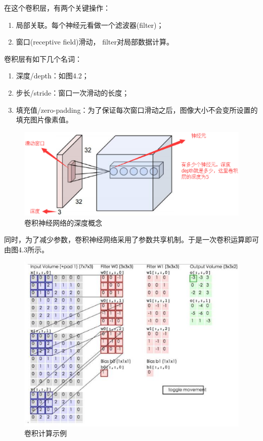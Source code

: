 \documentclass[UTF8, a4paper, 12pt]{report}
\begin{document}
			在这个卷积层，有两个关键操作：
			\begin{enumerate}[itemindent=1em]
				\renewcommand{\labelenumi}{\theenumi)}
				\item 局部关联。每个神经元看做一个滤波器(filter)；
				\item 窗口(receptive field)滑动， filter对局部数据计算。
			\end{enumerate}
	
			卷积层有如下几个名词：
			\begin{enumerate}[itemindent=1em]
				\renewcommand{\labelenumi}{\theenumi)}
				\item 深度/depth：如图4.2；
				\item 步长/stride：窗口一次滑动的长度；
				\item 填充值/zero-padding：为了保证每次窗口滑动之后，图像大小不会变所设置的填充图片像素值。
			\end{enumerate}
			\begin{figure}[!h]
			\centering
			\includegraphics[scale=0.45]{./img/Depth.eps}
			\caption{卷积神经网络的深度概念}
			\label{fig:4.2}
			\end{figure}
	
			同时，为了减少参数，卷积神经网络采用了参数共享机制。于是一次卷积运算即可由图4.3所示。
			\begin{figure}[!h]
			\centering
			\includegraphics[scale=0.5]{./img/Kernel.eps}
			\caption{卷积计算示例}
			\label{fig:4.3}
			\end{figure}
\end{document}
